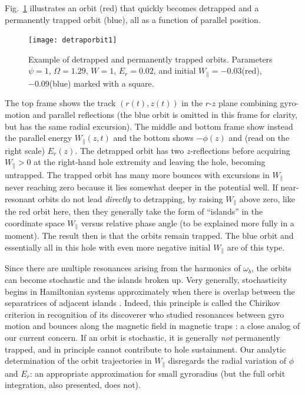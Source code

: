 \documentclass{agujournal2019}
\def\citep{\cite}
\begin{document}
Fig.\ \ref{fig:detraporbit1} illustrates an orbit (red) that quickly
becomes detrapped and a permanently trapped orbit (blue), all as a
function of parallel position.
\begin{figure}[htp]
  \centering
  \texttt{[image: detraporbit1]}
  \caption{Example of detrapped and permanently trapped
    orbits. Parameters $\psi=1$, $\Omega=1.29$, $W=1$, $E_r=0.02$,
    and initial $W_\parallel=-0.03$(red), $-0.09$(blue) marked with a
    square.
}
  \label{fig:detraporbit1}
\end{figure}
The top frame shows the track $(r(t),z(t))$ in the $r$-$z$ plane combining
gyro-motion and parallel reflections (the blue orbit is omitted in
this frame for clarity, but has the same radial excursion). The middle and
bottom frame show instead the parallel energy $W_\parallel(z,t)$ and the
bottom shows $-\phi(z)$ and (read on the right scale) $E_r(z)$. The
detrapped orbit has two $z$-reflections before acquiring
$W_\parallel>0$ at the right-hand hole extremity and leaving the hole,
becoming untrapped. The trapped orbit has many more bounces with
excursions in $W_\parallel$ never reaching zero because it lies
somewhat deeper in the potential well.  If near-resonant orbits do not
lead \emph{directly} to detrapping, by raising $W_\parallel$ above
zero, like the red orbit here, then they generally take the form of
``islands'' in the coordinate space $W_\parallel$ versus relative
phase angle (to be explained more fully in a moment). The result then
is that the orbits remain trapped.  The blue orbit and essentially all
in this hole with even more negative initial $W_\parallel$ are of this
type.

Since there are multiple resonances arising from the harmonics of
$\omega_b$, the orbits can become stochastic and the islands broken
up. Very generally, stochasticity begins in Hamiltonian systems
approximately when there is overlap between the separatrices of
adjacent islands \citep{Chirikov1979,Meiss1992}. Indeed, this
principle is called the Chirikov criterion in recognition of its
discoverer who studied resonances between gyro motion and bounces
along the magnetic field in magnetic traps \citep{Chirikov1960}: a
close analog of our current concern.  If an orbit is stochastic, it is
generally \emph{not} permanently trapped, and in principle cannot
contribute to hole sustainment. Our analytic determination of the
orbit trajectories in $W_\parallel$ disregards the radial variation
of $\phi$ and $E_r$: an appropriate approximation for small
gyroradius (but the full orbit integration, also presented, does not).
\end{document}
